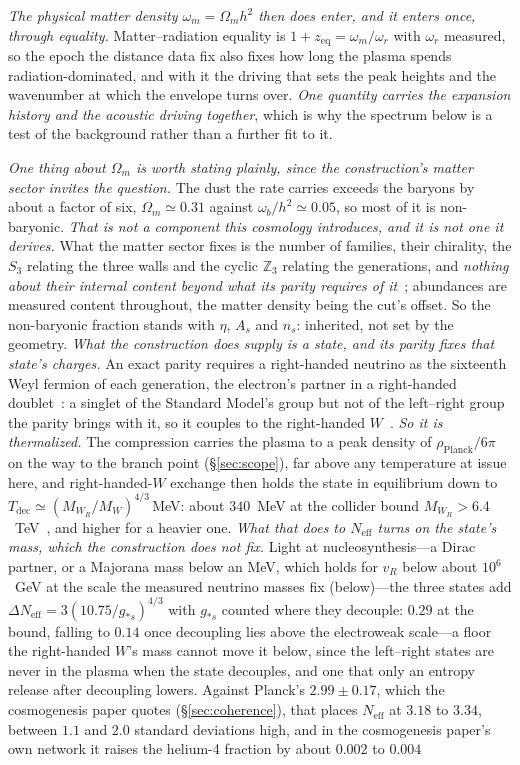\documentclass[11pt,a4paper]{article}
\theoremstyle{plain}
\theoremstyle{definition}
\theoremstyle{remark}
\begin{document}
\emph{The physical matter density $\omega_m=\Omega_m h^{2}$ then does enter, and it enters once, through equality.} Matter--radiation equality is $1+z_{\mathrm{eq}}=\omega_m/\omega_r$ with $\omega_r$ measured, so the epoch the distance data fix also fixes how long the plasma spends radiation-dominated, and with it the driving that sets the peak heights and the wavenumber at which the envelope turns over. \emph{One quantity carries the expansion history and the acoustic driving together}, which is why the spectrum below is a test of the background rather than a further fit to it.

\emph{One thing about $\Omega_m$ is worth stating plainly, since the construction's matter sector invites the question.} The dust the rate carries exceeds the baryons by about a factor of six, $\Omega_m\simeq0.31$ against $\omega_b/h^{2}\simeq0.05$, so most of it is non-baryonic. \emph{That is not a component this cosmology introduces, and it is not one it derives.} What the matter sector fixes is the number of families, their chirality, the $S_3$ relating the three walls and the cyclic $\mathbb{Z}_3$ relating the generations, and \emph{nothing about their internal content beyond what its parity requires of it}~\cite{JanzenMatter}; abundances are measured content throughout, the matter density being the cut's offset. So the non-baryonic fraction stands with $\eta$, $A_s$ and $n_s$: inherited, not set by the geometry. \emph{What the construction does supply is a state, and its parity fixes that state's charges.} An exact parity requires a right-handed neutrino as the sixteenth Weyl fermion of each generation, the electron's partner in a right-handed doublet~\cite{JanzenMatter}: a singlet of the Standard Model's group but not of the left--right group the parity brings with it, so it couples to the right-handed $W$~\cite{JanzenSynthesis}. \emph{So it is thermalized.} The compression carries the plasma to a peak density of $\rho_{\mathrm{Planck}}/6\pi$ on the way to the branch point (\S\ref{sec:scope}), far above any temperature at issue here, and right-handed-$W$ exchange then holds the state in equilibrium down to $T_{\mathrm{dec}}\simeq(M_{W_R}/M_W)^{4/3}\,$MeV: about $340$~MeV at the collider bound $M_{W_R}>6.4$~TeV~\cite{ATLAS2023WR}, and higher for a heavier one. \emph{What that does to $N_{\mathrm{eff}}$ turns on the state's mass, which the construction does not fix.} Light at nucleosynthesis---a Dirac partner, or a Majorana mass below an MeV, which holds for $v_R$ below about $10^{6}$~GeV at the scale the measured neutrino masses fix (below)---the three states add $\Delta N_{\mathrm{eff}}=3(10.75/g_{*s})^{4/3}$ with $g_{*s}$ counted where they decouple: $0.29$ at the bound, falling to $0.14$ once decoupling lies above the electroweak scale---a floor the right-handed $W$'s mass cannot move it below, since the left--right states are never in the plasma when the state decouples, and one that only an entropy release after decoupling lowers. Against Planck's $2.99\pm0.17$, which the cosmogenesis paper quotes (\S\ref{sec:coherence}), that places $N_{\mathrm{eff}}$ at $3.18$ to $3.34$, between $1.1$ and $2.0$ standard deviations high, and in the cosmogenesis paper's own network it raises the helium-4 fraction by about $0.002$ to $0.004$ 
\end{document}
